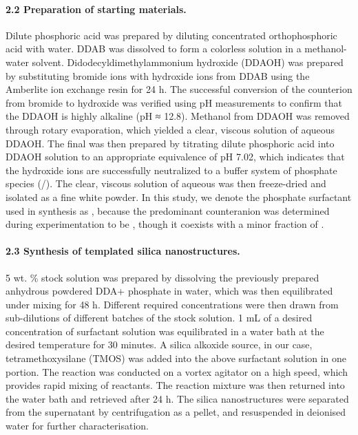 \documentclass[a4paper,12pt,twocolumn]{article}
\begin{document}
	 \paragraph{2.2 Preparation of starting materials.} Dilute phosphoric acid was prepared by diluting concentrated orthophosphoric acid with water. DDAB was dissolved to form a colorless solution in a methanol-water solvent. Didodecyldimethylammonium hydroxide (DDAOH) was prepared by substituting bromide ions with hydroxide ions from DDAB using the Amberlite ion exchange resin for 24 h. The successful conversion of the counterion from bromide to hydroxide was verified using pH measurements to confirm that the DDAOH is highly alkaline (pH ≈ 12.8). Methanol from DDAOH was removed through rotary evaporation, which yielded a clear, viscous solution of aqueous DDAOH. The final  was then prepared by titrating dilute phosphoric acid into DDAOH solution to an appropriate equivalence of pH 7.02, which indicates that the hydroxide ions are successfully neutralized to a buffer system of phosphate species (/). The clear, viscous solution of aqueous  was then freeze-dried and isolated as a fine white powder. In this study, we denote the phosphate surfactant used in synthesis as , because the predominant counteranion was determined during experimentation to be , though it coexists with a minor fraction of .
	 
	 \paragraph{2.3 Synthesis of templated silica nanostructures.} 5 wt. \% stock  solution was prepared by dissolving the previously prepared anhydrous powdered DDA+ phosphate in water, which was then equilibrated under mixing for 48 h. Different required concentrations were then drawn from sub-dilutions of different batches of the stock solution. 1 mL of a desired concentration of surfactant solution was equilibrated in a water bath at the desired temperature for 30 minutes. A silica alkoxide source, in our case, tetramethoxysilane (TMOS) was added into the above surfactant solution in one portion. The reaction was conducted on a vortex agitator on a high speed, which provides rapid mixing of reactants. The reaction mixture was then returned into the water bath and retrieved after 24 h. The silica nanostructures were separated from the supernatant by centrifugation as a pellet, and resuspended in deionised water for further characterisation.
	 
\end{document}
